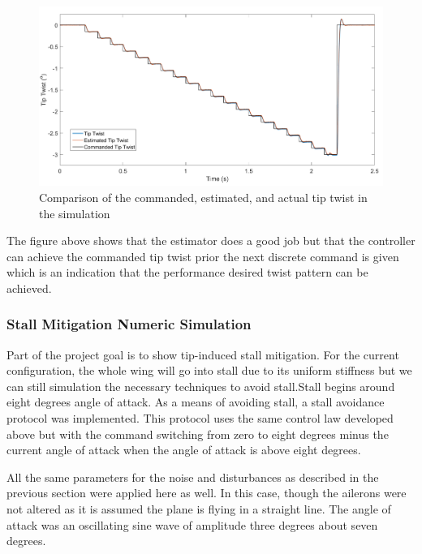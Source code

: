 \documentclass[11pt]{ucthesis}
\begin{document}
\begin{figure}[thpb]
\centering
\includegraphics[width=.9\linewidth]{Figures/AuroraProverseYawTwist.png}
\caption{Comparison of the commanded, estimated, and actual tip twist in the simulation}
\label{fig:APcommand}
\end{figure}

The figure above shows that the estimator does a good job but that the controller can achieve the commanded tip twist prior the next discrete command is given which is an indication that the performance desired twist pattern can be achieved.

\subsubsection{Stall Mitigation Numeric Simulation}
\label{sec:stallSim}
Part of the project goal is to show tip-induced stall mitigation. For the current configuration, the whole wing will go into stall due to its uniform stiffness but we can still simulation the necessary techniques to avoid stall.Stall begins around eight degrees angle of attack. As a means of avoiding stall, a stall avoidance protocol was implemented. This protocol uses the same control law developed above but with the command switching from zero to eight degrees minus the current angle of attack when the angle of attack is above eight degrees. 

All the same parameters for the noise and disturbances as described in the previous section were applied here as well. In this case, though the ailerons were not altered as it is assumed the plane is flying in a straight line. The angle of attack was an oscillating sine wave of amplitude three degrees about seven degrees.
\end{document}
